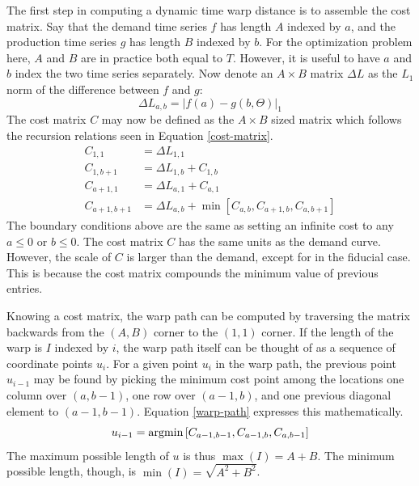 The first step in computing a dynamic time warp distance is to 
assemble the cost matrix. Say that the demand time series $f$ has 
length $A$ indexed by $a$, and the production time series $g$ has 
length $B$ indexed by $b$. For the optimization problem here, $A$ and $B$
are in practice both equal to $T$.  However, it is useful to have $a$ and 
$b$ index the two time series separately. Now denote an $A\times B$ matrix 
$\Delta L$ as the $L_1$ norm of the difference between $f$ and $g$:
\begin{equation}
\label{delta-l1}
\Delta L_{a,b} = \left|f(a) - g(b, \Theta)\right|_1
\end{equation}
The cost matrix $C$ may now be defined as the $A\times B$ sized matrix 
which follows the recursion relations seen in Equation \ref{cost-matrix}.
\begin{equation}
\label{cost-matrix}
\begin{split}
C_{1,1} & = \Delta L_{1,1}\\
C_{1,b+1} & = \Delta L_{1,b} + C_{1,b}\\
C_{a+1,1} & = \Delta L_{a,1} + C_{a,1}\\
C_{a+1,b+1} & = \Delta L_{a,b} + \min\left[C_{a,b}, C_{a+1,b}, C_{a,b+1}\right]
\end{split}
\end{equation}
The boundary conditions above are the same as setting an infinite cost to 
any $a \le 0$ or $b \le 0$. The cost matrix $C$ has the same units as the 
demand curve. However, the scale of $C$ is 
larger than the demand, 
except for in the fiducial case. This is because the cost matrix compounds the 
minimum value of previous entries. 

Knowing a cost matrix, the warp path can be computed by traversing the 
matrix backwards from the $(A, B)$ corner to the $(1, 1)$ corner.
If the length of the warp is $I$ indexed by $i$, the warp path itself 
can be thought of as a sequence of coordinate points $u_i$. For a given 
point $u_i$ in the warp path, the previous point $u_{i-1}$ may be found by 
picking the minimum cost point among the locations one column over $(a,b-1)$, 
one row over $(a-1,b)$, and one previous diagonal element to $(a-1,b-1)$. 
Equation \ref{warp-path} expresses this mathematically.
\begin{equation}
\label{warp-path}
u_{i-1} = \mathrm{argmin}\left[C_{a-1,b-1}, C_{a-1,b}, C_{a,b-1}\right]
\end{equation}
The maximum possible length of $u$ is thus $\max(I) = A + B$.
The minimum possible length, though, is $\min(I) = \sqrt{A^2 + B^2}$. 

